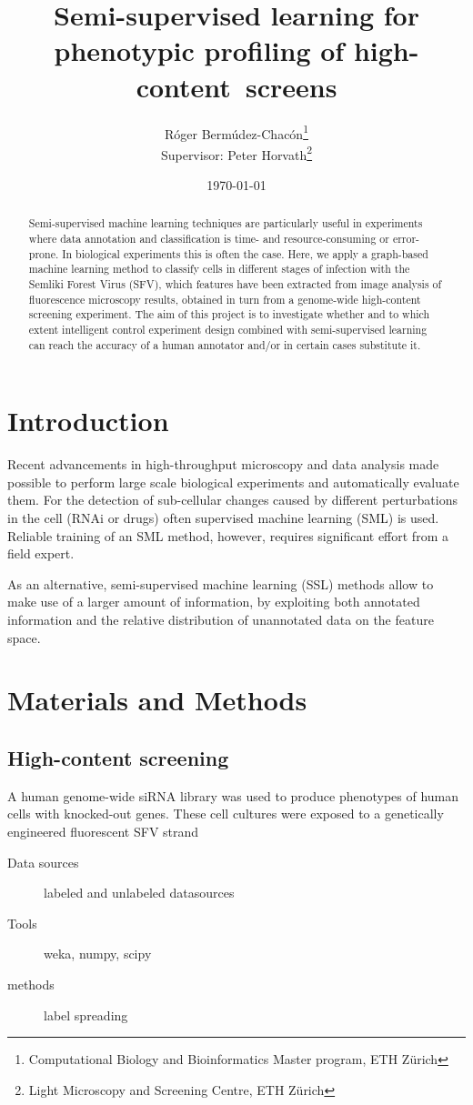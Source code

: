 \documentclass[oneside, a4paper, draft]{memoir} %
\title{
	Semi-supervised learning for phenotypic profiling of \mbox{high-content screens\ifdraft{ (DRAFT)}{\thanks{This project was held as a Lab Rotation in Computer Science,
			as required by the Master program in Computational Biology and Bioinformatics - ETH Z\"urich}}}}
\author{
	\ifdraft{Roger Bermudez-Chacon\\Supervisor: Peter Horvath}
	        {Róger Bermúdez-Chacón\thanks{Computational Biology and Bioinformatics Master program, ETH Z\"urich}\\
			 Supervisor: Peter Horvath\thanks{Light Microscopy and Screening Centre, ETH Z\"urich}}
}
\date{\today}
\begin{document}
\maketitle
\begin{abstract}
Semi-supervised machine learning techniques are particularly useful in experiments where data annotation and classification
is time- and resource-consuming or error-prone. In biological experiments this is often the case.
Here, we apply a graph-based machine learning method to classify cells in different stages of infection with the Semliki Forest Virus (SFV),
which features have been extracted from image analysis of fluorescence microscopy results, obtained in turn from a genome-wide
high-content screening experiment.
The aim of this project is to investigate whether and to which extent intelligent control experiment design 
combined with semi-supervised learning can reach the accuracy of a human annotator and/or in certain 
cases substitute it.

\end{abstract}
\setcounter{secnumdepth}{0}

\section{Introduction}
Recent advancements in high-throughput microscopy and data analysis made possible to perform large 
scale biological experiments and automatically evaluate them. For the detection of sub-cellular changes 
caused by different perturbations in the cell (RNAi or drugs) often supervised machine learning (SML) 
is used. Reliable training of an SML method, however, requires significant effort from a field expert.

As an alternative, semi-supervised machine learning (SSL) methods allow to make use of a larger amount of information,
by exploiting both annotated information and the relative distribution of unannotated data on the feature space.

\section{Materials and Methods}
\subsection{High-content screening}
A human genome-wide siRNA library was used to produce phenotypes of human cells with knocked-out genes. These cell cultures 
were exposed to a genetically engineered fluorescent SFV strand
\lipsum[27]
\begin{description}
	\item[Data sources]

	labeled and unlabeled datasources
	\item[Tools] weka, numpy, scipy
	\item[methods] label spreading
\end{description}
\end{document}

